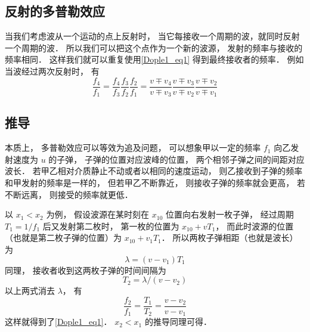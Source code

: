 \subsection{反射的多普勒效应}
当我们考虑波从一个运动的点上反射时， 当它每接收一个周期的波，就同时反射一个周期的波． 所以我们可以把这个点作为一个新的波源， 发射的频率与接收的频率相同． 这样我们就可以重复使用\autoref{Dople1_eq1} 得到最终接收者的频率． 例如当波经过两次反射时， 有
\begin{equation}
\frac{f_4}{f_1} = \frac{f_4}{f_3}\frac{f_3}{f_2}\frac{f_2}{f_1}
= \frac{v \mp v_4}{v \mp v_3}\frac{v \mp v_3}{v \mp v_2}\frac{v \mp v_2}{v \mp v_1}
\end{equation}


\subsection{推导}
本质上， 多普勒效应可以等效为追及问题， 可以想象甲以一定的频率 $f_1$ 向乙发射速度为 $u$ 的子弹， 子弹的位置对应波峰的位置， 两个相邻子弹之间的间距对应波长． 若甲乙相对介质静止不动或者以相同的速度运动， 则乙接收到子弹的频率和甲发射的频率是一样的， 但若甲乙不断靠近， 则接收子弹的频率就会更高， 若不断远离， 则接受的频率就更低．

以 $x_1 < x_2$ 为例， 假设波源在某时刻在 $x_{10}$ 位置向右发射一枚子弹， 经过周期 $T_1 = 1/f_1$ 后又发射第二枚时， 第一枚的位置为 $x_{10} + vT_1$， 而此时波源的位置（也就是第二枚子弹的位置）为 $x_{10} + v_1 T_1$． 所以两枚子弹相距（也就是波长）为
\begin{equation}
\lambda = (v - v_1)T_1
\end{equation}
同理， 接收者收到这两枚子弹的时间间隔为
\begin{equation}
T_2 = \lambda/ (v - v_2)
\end{equation}
以上两式消去 $\lambda$， 有
\begin{equation}
\frac{f_2}{f_1} = \frac{T_1}{T_2} = \frac{v - v_2}{v - v_1}
\end{equation}
这样就得到了\autoref{Dople1_eq1}． $x_2 < x_1$ 的推导同理可得．
